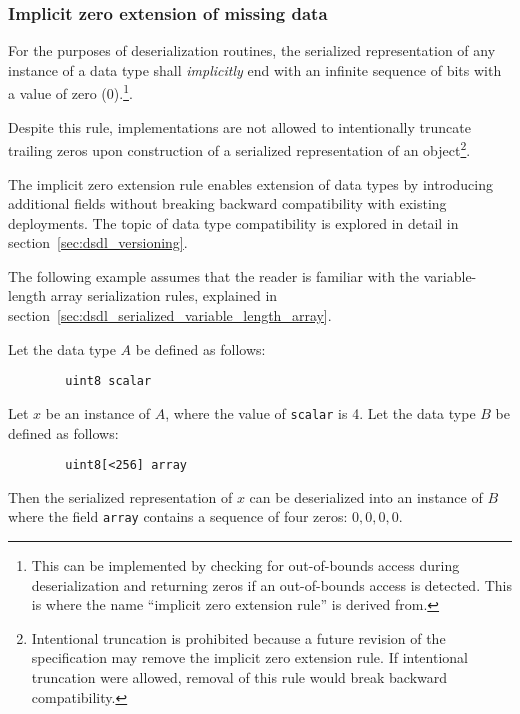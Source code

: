 \subsubsection{Implicit zero extension of missing data}

For the purposes of deserialization routines,
the serialized representation of any instance of a data type shall \emph{implicitly} end with an
infinite sequence of bits with a value of zero (0).\footnote{%
    This can be implemented by checking for out-of-bounds access during deserialization and returning zeros
    if an out-of-bounds access is detected. This is where the name ``implicit zero extension rule'' is derived
    from.
}.

Despite this rule, implementations are not allowed to intentionally truncate trailing zeros
upon construction of a serialized representation of an object\footnote{%
    Intentional truncation is prohibited because a future revision of the specification may remove the implicit zero
    extension rule.
    If intentional truncation were allowed, removal of this rule would break backward compatibility.
}.

\begin{remark}
    The implicit zero extension rule enables extension of data types by introducing additional fields
    without breaking backward compatibility with existing deployments.
    The topic of data type compatibility is explored in detail in section~\ref{sec:dsdl_versioning}.

    The following example assumes that the reader is familiar with the variable-length array serialization rules,
    explained in section~\ref{sec:dsdl_serialized_variable_length_array}.

    Let the data type $A$ be defined as follows:

    \begin{verbatim}
        uint8 scalar
    \end{verbatim}

    Let $x$ be an instance of $A$, where the value of \verb|scalar| is 4.
    Let the data type $B$ be defined as follows:

    \begin{verbatim}
        uint8[<256] array
    \end{verbatim}

    Then the serialized representation of $x$ can be deserialized into an instance of $B$ where the field
    \verb|array| contains a sequence of four zeros: $0, 0, 0, 0$.
\end{remark}

